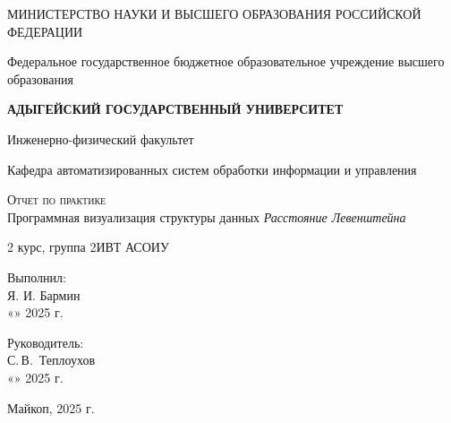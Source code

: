 \documentclass[12pt,a4paper]{scrartcl}
\begin{document}
	\begin{titlepage}
		\begin{center}
			\large
			МИНИСТЕРСТВО НАУКИ И ВЫСШЕГО ОБРАЗОВАНИЯ РОССИЙСКОЙ ФЕДЕРАЦИИ
			
			Федеральное государственное бюджетное образовательное учреждение высшего образования
			
			\textbf{АДЫГЕЙСКИЙ ГОСУДАРСТВЕННЫЙ УНИВЕРСИТЕТ}
			\vspace{0.25cm}
			
			Инженерно-физический факультет
			
			Кафедра автоматизированных систем обработки информации и управления
			\vfill
			
			\textsc{Отчет по практике}\\[5mm]
			
			{\LARGE Программная визуализация структуры данных \textit{Расстояние Левенштейна}}
			\bigskip
			
			2 курс, группа 2ИВТ АСОИУ
		\end{center}
		\vfill
		
		\newlength{\ML}
		\hfill\begin{minipage}{0.5\textwidth}
			Выполнил:\\
			\underline{\hspace{\ML}} Я. И. Бармин\\
			«\underline{\hspace{0.7cm}}» \underline{\hspace{2cm}} 2025 г.
		\end{minipage}%
		\bigskip
		
		\hfill\begin{minipage}{0.5\textwidth}
			Руководитель:\\
			\underline{\hspace{\ML}} С.\,В.~Теплоухов\\
			«\underline{\hspace{0.7cm}}» \underline{\hspace{2cm}} 2025 г.
		\end{minipage}%
		\vfill
		
		\begin{center}
			Майкоп, 2025 г.
		\end{center}
	\end{titlepage}

    \newpage
\end{document}
